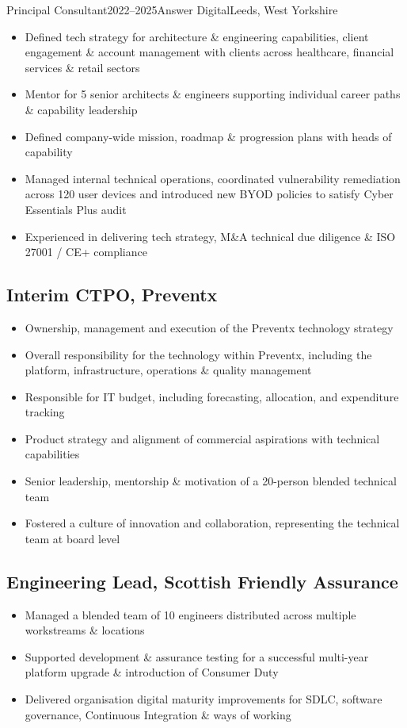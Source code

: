 \documentclass{cv}
\begin{document}
\begin{experienceplain}{Principal Consultant}{2022--2025}{Answer Digital}{Leeds, West Yorkshire}
\begin{itemize}
\item Defined tech strategy for architecture \& engineering capabilities, client engagement \&
      account management with clients across healthcare, financial services \& retail sectors
\item Mentor for 5 senior architects \& engineers supporting individual career paths \& capability leadership
\item Defined company-wide mission, roadmap \& progression plans with heads of capability
\item Managed internal technical operations, coordinated vulnerability remediation across 120 user
      devices and introduced new BYOD policies to satisfy Cyber Essentials Plus audit
\item Experienced in delivering tech strategy, M\&A technical due diligence \& ISO 27001 / CE+ compliance
\end{itemize}

\subsection{Interim CTPO, Preventx}
\begin{itemize}
\item Ownership, management and execution of the Preventx technology strategy
\item Overall responsibility for the technology within Preventx, including the platform,
      infrastructure, operations \& quality management
\item Responsible for IT budget, including forecasting, allocation, and expenditure tracking
\item Product strategy and alignment of commercial aspirations with technical capabilities
\item Senior leadership, mentorship \& motivation of a 20-person blended technical team
\item Fostered a culture of innovation and collaboration, representing the technical team at board level
\end{itemize}

\subsection{Engineering Lead, Scottish Friendly Assurance}
\begin{itemize}
\item Managed a blended team of 10 engineers distributed across multiple workstreams \& locations
\item Supported development \& assurance testing for a successful multi-year platform upgrade \&
      introduction of Consumer Duty
\item Delivered organisation digital maturity improvements for SDLC, software governance,
      Continuous Integration \& ways of working
\end{itemize}


\end{experienceplain}
\end{document}
